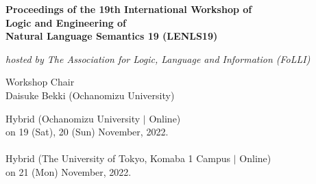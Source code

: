 \documentclass[12pt]{jarticle}
\begin{document}
\pagestyle{empty}

\vspace*{1cm}
\begin{Large}
\begin{center}
{\bf Proceedings of the 19th International Workshop of \\
     Logic and Engineering of \\Natural Language Semantics 19 (LENLS19)}
\end{center}
\end{Large}
\vspace*{1cm}
\begin{Large}
\begin{center}
{\em hosted by The Association for Logic, Language and Information (FoLLI)}
\end{center}
\end{Large}
\begin{large}
\vspace*{1cm}
\begin{center}
Workshop Chair\\ $\;$\\
Daisuke Bekki (Ochanomizu University)
\end{center}
\end{large}
\vspace*{3cm}
\vspace*{1cm}
\begin{large}
\begin{center}
Hybrid (Ochanomizu University $|$ Online) \\
on 19 (Sat), 20 (Sun) November, 2022. \\\ \\
Hybrid (The University of Tokyo, Komaba 1 Campus $|$ Online) \\
on 21 (Mon) November, 2022. 
\end{center}
\end{large}
\vfill

\newpage

\vspace*{20cm}
\vfill
\begin{large}

\end{large}
\end{document}
